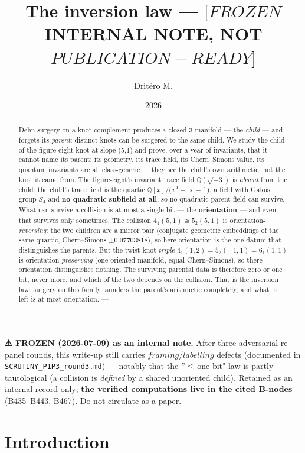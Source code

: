 \documentclass[11pt]{article}
\title{The inversion law — \([FROZEN\) INTERNAL NOTE, NOT \(PUBLICATION-READY]\)}
\author{Dritëro M.}
\date{2026}
\theoremstyle{plain}
\theoremstyle{definition}
\theoremstyle{remark}
\begin{document}
\maketitle
\begin{abstract}
Dehn surgery on a knot complement produces a closed 3-manifold — the \emph{child} — and forgets its \emph{parent}: distinct knots can be surgered to the same child. We study the child of the figure-eight knot at slope (5,1) and prove, over a year of invariants, that it cannot name its parent: its geometry, its trace field, its Chern–Simons value, its quantum invariants are all class-generic — they see the child's own arithmetic, not the knot it came from. The figure-eight's invariant trace field \(\mathbb{Q}(\sqrt{-3})\) is \emph{absent} from the child: the child's trace field is the quartic \(\mathbb{Q}[x]/(x^{4} -\) x \(-\) 1), a field with Galois group \(S_{4}\) and \textbf{no quadratic subfield at all}, so no quadratic parent-field can survive. What can survive a collision is at most a single bit — the \textbf{orientation} — and even that survives only sometimes. The collision \(4_{1}(5,1) \cong  5_{2}(5,1)\) is orientation-\emph{reversing}: the two children are a mirror pair (conjugate geometric embeddings of the same quartic, Chern–Simons \(\pm 0.07703818\)), so here orientation is the one datum that distinguishes the parents. But the twist-knot \emph{triple} \(4_{1}(1,2) = 5_{2}(-1,1) = 6_{1}(1,1)\) is orientation-\emph{preserving} (one oriented manifold, equal Chern–Simons), so there orientation distinguishes nothing. The surviving parental data is therefore zero or one bit, never more, and which of the two depends on the collision. That is the inversion law: surgery on this family launders the parent's arithmetic completely, and what is left is at most orientation.  ---
\end{abstract}
\textbf{⚠ FROZEN (2026-07-09) as an internal note.} After three adversarial re-panel rounds, this write-up still carries \(framing/labelling\) defects (documented in \texttt{SCRUTINY\_P1P3\_round3.md}) — notably that the \("\le \) one bit" law is partly tautological (a collision is \emph{defined} by a shared unoriented child). Retained as an internal record only; \textbf{the verified computations live in the cited B-nodes} (B435–B443, B467). Do not circulate as a paper.

\section{Introduction}
\end{document}
